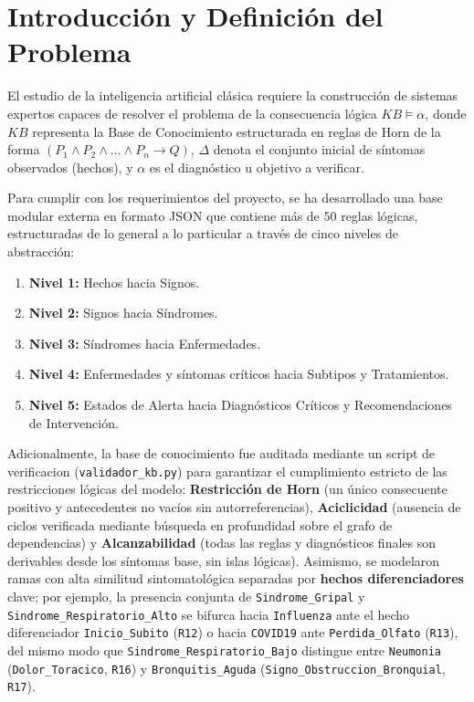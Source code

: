 \documentclass[11pt,a4paper]{article}
\begin{document}
\vspace{0.5cm}

\section{Introducción y Definición del Problema}
El estudio de la inteligencia artificial clásica requiere la construcción de sistemas expertos capaces de resolver el problema de la consecuencia lógica $KB \models \alpha$, donde $KB$ representa la Base de Conocimiento estructurada en reglas de Horn de la forma $(P_1 \wedge P_2 \wedge \dots \wedge P_n \rightarrow Q)$, $\Delta$ denota el conjunto inicial de síntomas observados (hechos), y $\alpha$ es el diagnóstico u objetivo a verificar. 

Para cumplir con los requerimientos del proyecto, se ha desarrollado una base modular externa en formato JSON que contiene más de 50 reglas lógicas, estructuradas de lo general a lo particular a través de cinco niveles de abstracción:
\begin{enumerate}
    \item \textbf{Nivel 1:} Hechos hacia Signos.
    \item \textbf{Nivel 2:} Signos hacia Síndromes.
    \item \textbf{Nivel 3:} Síndromes hacia Enfermedades.
    \item \textbf{Nivel 4:} Enfermedades y síntomas críticos hacia Subtipos y Tratamientos.
    \item \textbf{Nivel 5:} Estados de Alerta hacia Diagnósticos Críticos y Recomendaciones de Intervención.
\end{enumerate}

Adicionalmente, la base de conocimiento fue auditada mediante un script de verificacion (\texttt{validador\_kb.py}) para garantizar el cumplimiento estricto de las restricciones lógicas del modelo: \textbf{Restricción de Horn} (un único consecuente positivo y antecedentes no vacíos sin autorreferencias), \textbf{Aciclicidad} (ausencia de ciclos verificada mediante búsqueda en profundidad sobre el grafo de dependencias) y \textbf{Alcanzabilidad} (todas las reglas y diagnósticos finales son derivables desde los síntomas base, sin islas lógicas). Asimismo, se modelaron ramas con alta similitud sintomatológica separadas por \textbf{hechos diferenciadores} clave; por ejemplo, la presencia conjunta de \texttt{Sindrome\_Gripal} y \texttt{Sindrome\_Respiratorio\_Alto} se bifurca hacia \texttt{Influenza} ante el hecho diferenciador \texttt{Inicio\_Subito} (\texttt{R12}) o hacia \texttt{COVID19} ante \texttt{Perdida\_Olfato} (\texttt{R13}), del mismo modo que \texttt{Sindrome\_Respiratorio\_Bajo} distingue entre \texttt{Neumonia} (\texttt{Dolor\_Toracico}, \texttt{R16}) y \texttt{Bronquitis\_Aguda} (\texttt{Signo\_Obstruccion\_Bronquial}, \texttt{R17}).
\end{document}
